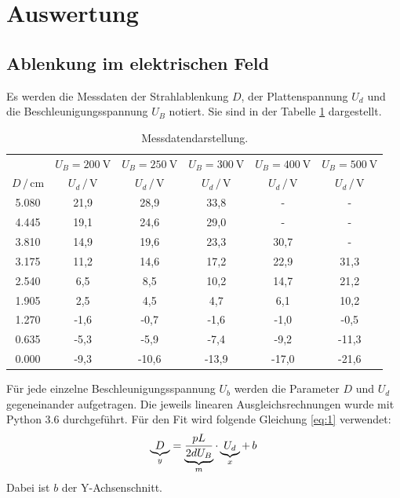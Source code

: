 \section{Auswertung}
\subsection{Ablenkung im elektrischen Feld}
Es werden die Messdaten der Strahlablenkung $D$, der Plattenspannung $U_d$ und die Beschleunigungsspannung $U_B$ notiert.
Sie sind in der Tabelle \ref{tab:1} dargestellt.
\begin{table}[H]
  \centering
  \caption{Messdatendarstellung.}
  \label{tab:1}
  \begin{tabular}{c c c c c c}
\toprule
& \multicolumn{1}{c}{$U_B=\SI{200}{\volt}$} & \multicolumn{1}{c}{$U_B=\SI{250}{\volt}$} &\multicolumn{1}{c}{$U_B=\SI{300}{\volt}$}&\multicolumn{1}{c}{$U_B=\SI{400}{\volt}$}&\multicolumn{1}{c}{$U_B=\SI{500}{\volt}$}\\
\cmidrule(lr){2-2}\cmidrule(lr){3-3}\cmidrule(lr){4-4}\cmidrule(lr){5-5}\cmidrule(lr){6-6}
$D \, / \, \si{\centi\meter}$ & $U_d \, / \, \si{\volt}$ & $U_d \, / \, \si{\volt}$ & $U_d \, / \, \si{\volt}$ &$U_d \, / \, \si{\volt}$ & $U_d \, / \, \si{\volt}$\\
\midrule
5.080 & 21,9  & 28,9  & 33,8  & -    & -   \\
4.445 & 19,1  & 24,6  & 29,0  & -    & -   \\
3.810 & 14,9  & 19,6  & 23,3  & 30,7 & -   \\
3.175 & 11,2  & 14,6  & 17,2  & 22,9 & 31,3\\
2.540 &  6,5  &  8,5  & 10,2  & 14,7 & 21,2\\
1.905 &  2,5  &  4,5  &  4,7  &  6,1 & 10,2\\
1.270 & -1,6  & -0,7  & -1,6  & -1,0 & -0,5\\
0.635 & -5,3  & -5,9  & -7,4  & -9,2 &-11,3\\
0.000 & -9,3  &-10,6  &-13,9  &-17,0 &-21,6\\
\bottomrule
  \end{tabular}
\end{table}
Für jede einzelne Beschleunigungsspannung $U_b$ werden die
Parameter $D$ und $U_d$ gegeneinander aufgetragen.
Die jeweils linearen Ausgleichsrechnungen wurde mit Python 3.6 durchgeführt.
Für den Fit wird folgende Gleichung \ref{eq:1} verwendet:
\begin{equation*}
  \underbrace{D}_{\mathclap{y}} = \underbrace{\frac{pL}{2dU_B}}_{\mathclap{m}} \cdot \underbrace{U_d}_{\mathclap{x}} + \, b
\end{equation*}
Dabei ist $b$ der Y-Achsenschnitt.

